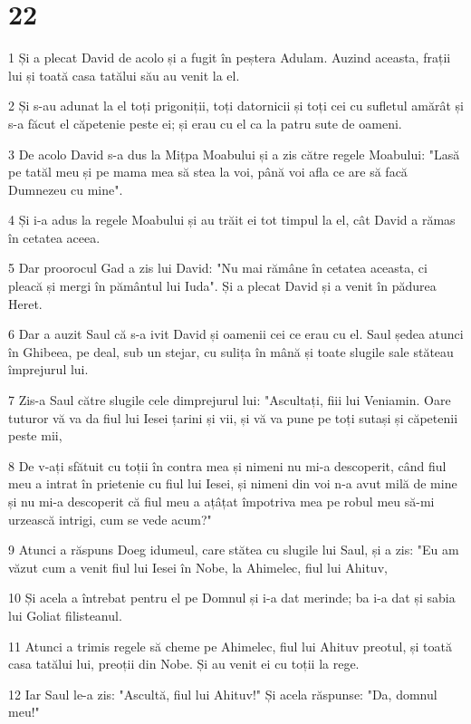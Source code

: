 \chapter{22}

\par 1 Și a plecat David de acolo și a fugit în peștera Adulam. Auzind aceasta, frații lui și toată casa tatălui său au venit la el.
\par 2 Și s-au adunat la el toți prigoniții, toți datornicii și toți cei cu sufletul amărât și s-a făcut el căpetenie peste ei; și erau cu el ca la patru sute de oameni.
\par 3 De acolo David s-a dus la Mițpa Moabului și a zis către regele Moabului: "Lasă pe tatăl meu și pe mama mea să stea la voi, până voi afla ce are să facă Dumnezeu cu mine".
\par 4 Și i-a adus la regele Moabului și au trăit ei tot timpul la el, cât David a rămas în cetatea aceea.
\par 5 Dar proorocul Gad a zis lui David: "Nu mai rămâne în cetatea aceasta, ci pleacă și mergi în pământul lui Iuda". Și a plecat David și a venit în pădurea Heret.
\par 6 Dar a auzit Saul că s-a ivit David și oamenii cei ce erau cu el. Saul ședea atunci în Ghibeea, pe deal, sub un stejar, cu sulița în mână și toate slugile sale stăteau împrejurul lui.
\par 7 Zis-a Saul către slugile cele dimprejurul lui: "Ascultați, fiii lui Veniamin. Oare tuturor vă va da fiul lui Iesei țarini și vii, și vă va pune pe toți sutași și căpetenii peste mii,
\par 8 De v-ați sfătuit cu toții în contra mea și nimeni nu mi-a descoperit, când fiul meu a intrat în prietenie cu fiul lui Iesei, și nimeni din voi n-a avut milă de mine și nu mi-a descoperit că fiul meu a ațâțat împotriva mea pe robul meu să-mi urzească intrigi, cum se vede acum?"
\par 9 Atunci a răspuns Doeg idumeul, care stătea cu slugile lui Saul, și a zis: "Eu am văzut cum a venit fiul lui Iesei în Nobe, la Ahimelec, fiul lui Ahituv,
\par 10 Și acela a întrebat pentru el pe Domnul și i-a dat merinde; ba i-a dat și sabia lui Goliat filisteanul.
\par 11 Atunci a trimis regele să cheme pe Ahimelec, fiul lui Ahituv preotul, și toată casa tatălui lui, preoții din Nobe. Și au venit ei cu toții la rege.
\par 12 Iar Saul le-a zis: "Ascultă, fiul lui Ahituv!" Și acela răspunse: "Da, domnul meu!"
